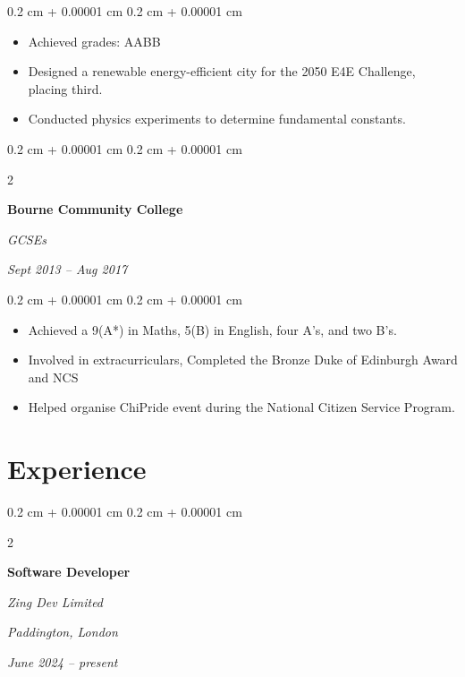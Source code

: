 \documentclass[10pt, letterpaper]{article}
\newenvironment{highlights}{
    \begin{itemize}[
        topsep=0.10 cm,
        parsep=0.10 cm,
        partopsep=0pt,
        itemsep=0pt,
        leftmargin=0.4 cm + 10pt
    ]
}{
    \end{itemize}
} %
\newenvironment{onecolentry}{
    \begin{adjustwidth}{
        0.2 cm + 0.00001 cm
    }{
        0.2 cm + 0.00001 cm
    }
}{
    \end{adjustwidth}
} %
\newenvironment{twocolentry}[2][]{
    \onecolentry
    \def\secondColumn{#2}
    \setcolumnwidth{\fill, 4.5 cm}
    \begin{paracol}{2}
}{
    \switchcolumn \raggedleft \secondColumn
    \end{paracol}
    \endonecolentry
} %
\begin{document}
        \vspace{0.10 cm}
        \begin{onecolentry}
            \begin{highlights}
                \item Achieved grades: AABB
                \item Designed a renewable energy-efficient city for the 2050 E4E Challenge, placing third.
                \item Conducted physics experiments to determine fundamental constants.
            \end{highlights}
        \end{onecolentry}


        \vspace{0.2 cm}

        \begin{twocolentry}{
            
            
        \textit{Sept 2013 – Aug 2017}}
            \textbf{Bourne Community College}

            \textit{GCSEs}
        \end{twocolentry}

        \vspace{0.10 cm}
        \begin{onecolentry}
            \begin{highlights}
                \item Achieved a 9(A*) in Maths, 5(B) in English, four A's, and two B's.
                \item Involved in extracurriculars, Completed the Bronze Duke of Edinburgh Award and NCS
                \item Helped organise ChiPride event during the National Citizen Service Program.
            \end{highlights}
        \end{onecolentry}



    
    \section{Experience}



        
        \begin{twocolentry}{
        \textit{Paddington, London}    
            
        \textit{June 2024 – present}}
            \textbf{Software Developer}
            
            \textit{Zing Dev Limited}
        \end{twocolentry}
\end{document}
